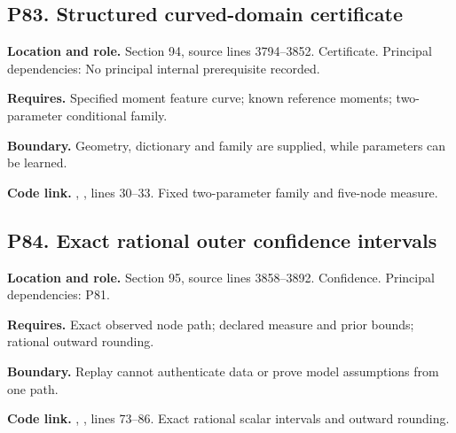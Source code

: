 \documentclass[11pt,letterpaper]{article}
\begin{document}
\par\noindent\begin{minipage}{\textwidth}
\subsection{P83. Structured curved-domain
certificate}\label{p83.-structured-curved-domain-certificate}

\textbf{Location and role.} Section 94, source lines 3794--3852.
Certificate. Principal dependencies: No principal internal prerequisite
recorded.

\textbf{Requires.} Specified moment feature curve; known reference
moments; two-parameter conditional family.

\textbf{Boundary.} Geometry, dictionary and family are supplied, while
parameters can be learned.

\textbf{Code link.} ,
, lines 30--33. Fixed two-parameter family and
five-node measure.
\end{minipage}\par\medskip

\par\noindent\begin{minipage}{\textwidth}
\subsection{P84. Exact rational outer confidence
intervals}\label{p84.-exact-rational-outer-confidence-intervals}

\textbf{Location and role.} Section 95, source lines 3858--3892.
Confidence. Principal dependencies: P81.

\textbf{Requires.} Exact observed node path; declared measure and prior
bounds; rational outward rounding.

\textbf{Boundary.} Replay cannot authenticate data or prove model
assumptions from one path.

\textbf{Code link.} ,
, lines 73--86. Exact rational scalar intervals
and outward rounding.
\end{minipage}\par\medskip
\end{document}
